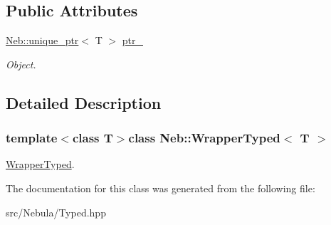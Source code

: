 \subsection*{\-Public \-Attributes}
\begin{DoxyCompactItemize}
\item 
\hypertarget{classNeb_1_1WrapperTyped_a7d25b0d41e0b8400f47dd11615509fc6}{\hyperlink{classNeb_1_1unique__ptr}{\-Neb\-::unique\-\_\-ptr}$<$ \-T $>$ \hyperlink{classNeb_1_1WrapperTyped_a7d25b0d41e0b8400f47dd11615509fc6}{ptr\-\_\-}}\label{classNeb_1_1WrapperTyped_a7d25b0d41e0b8400f47dd11615509fc6}

\begin{DoxyCompactList}\small\item\em \-Object. \end{DoxyCompactList}\end{DoxyCompactItemize}


\subsection{\-Detailed \-Description}
\subsubsection*{template$<$class \-T$>$class Neb\-::\-Wrapper\-Typed$<$ T $>$}

\hyperlink{classNeb_1_1WrapperTyped}{\-Wrapper\-Typed}. 

\-The documentation for this class was generated from the following file\-:\begin{DoxyCompactItemize}
\item 
src/\-Nebula/\-Typed.\-hpp\end{DoxyCompactItemize}
